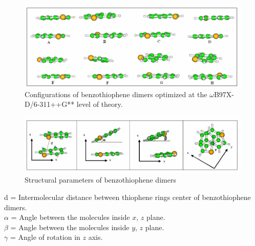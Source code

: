 	
	\begin{figure}[H]
		\centering
		\includegraphics[scale=0.88]{image/image/P1-F6} 
		\caption{Configurations of benzothiophene dimers optimized at the $\omega$B97X-D/6-311++G** level of theory.} \label{P1-F6}
	\end{figure}
	
	\begin{figure}[H]
		\centering
		\includegraphics[scale=0.88]{image/image/P1-F7}  
		\caption{Structural parameters of benzothiophene dimers} \label{P1-F7}
	\end{figure}
	
	\noindent d = Intermolecular distance between thiophene rings center of benzothiophene dimers.\\
	$\alpha$ = Angle between the molecules inside $x$, $z$ plane. \\
	$\beta$ = Angle between the molecules inside $y$, $z$ plane.\\
	$\gamma$ = Angle of rotation in $z$ axis.\\
	
